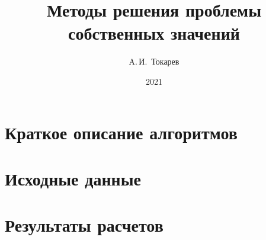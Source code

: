 \documentclass[12pt, a4paper]{article}
\title{Методы решения проблемы собственных значений}
\author{A.\,И.~Токарев}
\date{2021}
\begin{document}
\maketitle
\tableofcontents 
\newpage

\section{Краткое описание алгоритмов}


\section{Исходные данные}

\newpage

\section{Результаты расчетов}
\end{document}
